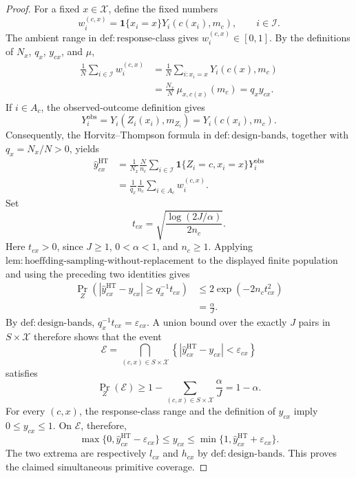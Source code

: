 \documentclass{article}
\begin{document}
\begin{proof}
For a fixed \(x\in\mathcal X\), define the fixed numbers
\[
w_i^{(c,x)}=\mathbf 1\{x_i=x\}Y_i(c(x_i),m_c),\qquad i\in\mathcal I.
\]
The ambient range in \(\mathrm{def{:}response\text{-}class}\) gives \(w_i^{(c,x)}\in[0,1]\).  By the definitions of \(N_x\), \(q_x\), \(y_{cx}\), and \(\mu\),
\[
\begin{aligned}
\frac1N\sum_{i\in\mathcal I}w_i^{(c,x)}
&=\frac1N\sum_{i:x_i=x}Y_i(c(x),m_c)\\
&=\frac{N_x}{N}\,\mu_{x,c(x)}(m_c)
=q_xy_{cx}.
\end{aligned}
\]
If \(i\in A_c\), the observed-outcome definition gives
\[
Y_i^{\mathrm{obs}}
=Y_i(Z_i(x_i),m_{Z_i})
=Y_i(c(x_i),m_c).
\]
Consequently, the Horvitz--Thompson formula in \(\mathrm{def{:}design\text{-}bands}\), together with \(q_x=N_x/N>0\), yields
\[
\begin{aligned}
\widehat y_{cx}^{\mathrm{HT}}
&=\frac1{N_x}\frac N{n_c}
  \sum_{i\in\mathcal I}\mathbf1\{Z_i=c,x_i=x\}Y_i^{\mathrm{obs}}\\
&=\frac1{q_x}\frac1{n_c}\sum_{i\in A_c}w_i^{(c,x)}.
\end{aligned}
\]
Set
\[
t_{cx}=\sqrt{\frac{\log(2J/\alpha)}{2n_c}}.
\]
Here \(t_{cx}>0\), since \(J\geq1\), \(0<\alpha<1\), and \(n_c\geq1\).  Applying \(\mathrm{lem{:}hoeffding\text{-}sampling\text{-}without\text{-}replacement}\) to the displayed finite population and using the preceding two identities gives
\[
\begin{aligned}
\Pr_Z\!\left(
 \left|\widehat y_{cx}^{\mathrm{HT}}-y_{cx}\right|
 \geq q_x^{-1}t_{cx}
\right)
&\leq 2\exp(-2n_ct_{cx}^{2})\\
&=\frac{\alpha}{J}.
\end{aligned}
\]
By \(\mathrm{def{:}design\text{-}bands}\), \(q_x^{-1}t_{cx}=\varepsilon_{cx}\).  A union bound over the exactly \(J\) pairs in \(S\times\mathcal X\) therefore shows that the event
\[
\mathcal E=
\bigcap_{(c,x)\in S\times\mathcal X}
\left\{\left|\widehat y_{cx}^{\mathrm{HT}}-y_{cx}\right|<\varepsilon_{cx}\right\}
\]
satisfies
\[
\Pr_Z(\mathcal E)
\geq 1-\sum_{(c,x)\in S\times\mathcal X}\frac{\alpha}{J}
=1-\alpha.
\]
For every \((c,x)\), the response-class range and the definition of \(y_{cx}\) imply \(0\leq y_{cx}\leq1\).  On \(\mathcal E\), therefore,
\[
\max\{0,\widehat y_{cx}^{\mathrm{HT}}-\varepsilon_{cx}\}
\leq y_{cx}
\leq
\min\{1,\widehat y_{cx}^{\mathrm{HT}}+\varepsilon_{cx}\}.
\]
The two extrema are respectively \(l_{cx}\) and \(h_{cx}\) by \(\mathrm{def{:}design\text{-}bands}\).  This proves the claimed simultaneous primitive coverage.


\end{proof}
\end{document}
